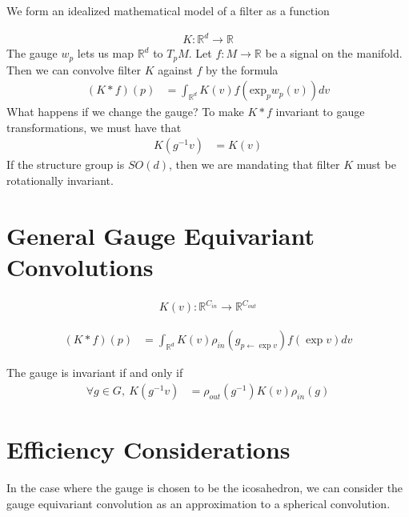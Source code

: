 \documentclass[book.tex]{subfiles}
\begin{document}
We form an idealized mathematical model of a filter as a function

\begin{align}
    K: \mathbb{R}^d \to \mathbb{R}
\end{align}
The gauge $w_p$ lets us map $\mathbb{R}^d$ to $T_p M$. Let $f: M \to \mathbb{R}$ be a signal on the manifold. Then we can convolve filter $K$ against $f$ by the formula
\begin{align}
    (K * f)(p) &= \int_{\mathbb{R}^d} K(v) f(\textrm{exp}_p w_p(v)) dv
\end{align}
What happens if we change the gauge? To make $K * f$ invariant to gauge transformations, we must have that
\begin{align}
K(g^{-1} v) &= K(v)
\end{align}
If the structure group is $SO(d)$, then we are mandating that filter $K$ must be rotationally invariant.

\section{General Gauge Equivariant Convolutions}

\begin{align}
K(v): \mathbb{R}^{C_{in}} \to \mathbb{R}^{C_{out}}
\end{align}

\begin{align}
(K*f)(p) &= \int_{\mathbb{R}^d} K(v) \rho_{in}(g_{p \leftarrow \exp v}) f(\exp v) dv
\end{align}

The gauge is invariant if and only if
\begin{align}
\forall g \in G, \  K(g^{-1}v) &= \rho_{out}(g^{-1})K(v)\rho_{in}(g)
\end{align}

\section{Efficiency Considerations}
In the case where the gauge is chosen to be the icosahedron, we can consider the gauge equivariant convolution as an approximation to a spherical convolution.
\end{document}

